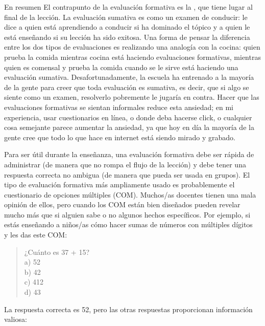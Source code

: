 \begin{aside}{En resumen}
El contrapunto de la evaluación formativa
es la ,
que tiene lugar al final de la lección.
La evaluación sumativa es como un examen de conducir:
le dice a quien está aprendiendo a conducir si ha dominado el tópico
y a quien le está enseñando si su lección ha sido exitosa.
Una forma de pensar la diferencia entre los dos tipos de evaluaciones es
realizando una analogía con la cocina:
quien prueba la comida mientras cocina está haciendo evaluaciones formativas,
mientras quien es comensal y prueba la comida cuando se le sirve está haciendo una evaluación sumativa. 
Desafortunadamente,
la escuela ha entrenado a la mayoría de la gente para creer que toda evaluación es sumativa, 
es decir, que si algo se siente como un examen,
resolverlo pobremente le jugaría en contra.
Hacer que las evaluaciones formativas se sientan informales reduce esta ansiedad;
en mi experiencia,
usar cuestionarios en línea, o donde deba hacerse click, o cualquier cosa semejante parece aumentar la ansiedad,
ya que hoy en día la mayoría de la gente cree que todo lo que hace en internet está siendo mirado y grabado.
\end{aside}
 
Para ser útil durante la enseñanza,
una evaluación formativa debe ser rápida de administrar
(de manera que no rompa el flujo de la lección)
y debe tener una respuesta correcta no ambigua
(de manera que pueda ser usada en grupos).
El tipo de evaluación formativa más ampliamente usado es probablemente
el cuestionario de opciones múltiples (COM).
Muchos/as docentes tienen una mala opinión de ellos,
pero cuando los COM están bien diseñados
pueden revelar mucho más que si alguien sabe o no algunos hechos específicos.
Por ejemplo,
si estás enseñando a niños/as cómo hacer sumas de números con múltiples dígitos~\cite{Ojos2015}
y les das este COM:

\begin{quote}
  ¿Cuánto es 37 + 15?\\
  a) 52\\
  b) 42\\
  c) 412\\
  d) 43
\end{quote}

\noindent
La respuesta correcta es 52,
pero las otras respuestas proporcionan información valiosa:

